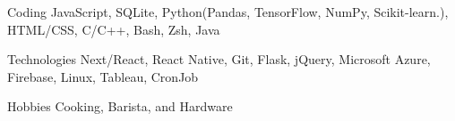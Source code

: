 

\begin{cvskills}

  \cvskill
    {Coding} %
    {JavaScript, SQLite, Python(Pandas, TensorFlow, NumPy, Scikit-learn.), HTML/CSS, C/C++, Bash, Zsh, Java} %

  \cvskill
    {Technologies} %
    {Next/React, React Native, Git, Flask, jQuery, Microsoft Azure, Firebase, Linux, Tableau, CronJob} %
    
  \cvskill
    {Hobbies} %
    {Cooking, Barista, and Hardware} %

\end{cvskills}
